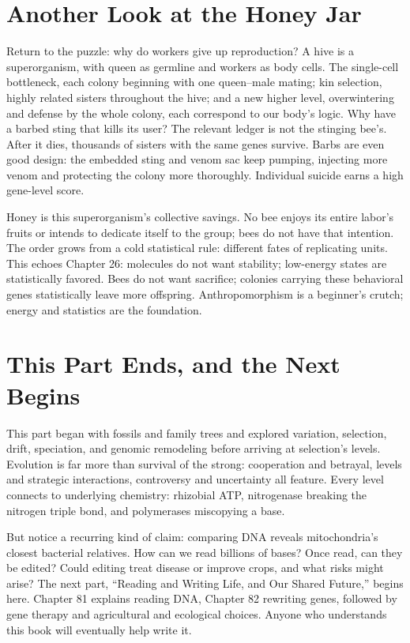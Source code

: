 \section{Another Look at the Honey Jar}

Return to the puzzle: why do workers give up reproduction? A hive is a superorganism, with queen as germline and workers as body cells. The single-cell bottleneck, each colony beginning with one queen--male mating; kin selection, highly related sisters throughout the hive; and a new higher level, overwintering and defense by the whole colony, each correspond to our body's logic. Why have a barbed sting that kills its user? The relevant ledger is not the stinging bee's. After it dies, thousands of sisters with the same genes survive. Barbs are even good design: the embedded sting and venom sac keep pumping, injecting more venom and protecting the colony more thoroughly. Individual suicide earns a high gene-level score.

Honey is this superorganism's collective savings. No bee enjoys its entire labor's fruits or intends to dedicate itself to the group; bees do not have that intention. The order grows from a cold statistical rule: different fates of replicating units. This echoes Chapter 26: molecules do not want stability; low-energy states are statistically favored. Bees do not want sacrifice; colonies carrying these behavioral genes statistically leave more offspring. Anthropomorphism is a beginner's crutch; energy and statistics are the foundation.

\section{This Part Ends, and the Next Begins}

This part began with fossils and family trees and explored variation, selection, drift, speciation, and genomic remodeling before arriving at selection's levels. Evolution is far more than survival of the strong: cooperation and betrayal, levels and strategic interactions, controversy and uncertainty all feature. Every level connects to underlying chemistry: rhizobial ATP, nitrogenase breaking the nitrogen triple bond, and polymerases miscopying a base.

But notice a recurring kind of claim: comparing DNA reveals mitochondria's closest bacterial relatives. How can we read billions of bases? Once read, can they be edited? Could editing treat disease or improve crops, and what risks might arise? The next part, ``Reading and Writing Life, and Our Shared Future,'' begins here. Chapter 81 explains reading DNA, Chapter 82 rewriting genes, followed by gene therapy and agricultural and ecological choices. Anyone who understands this book will eventually help write it.

